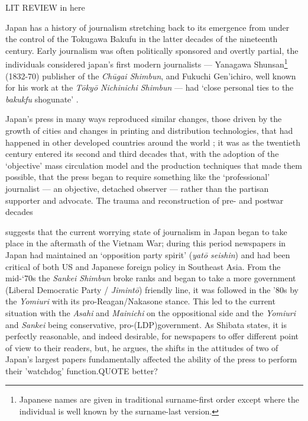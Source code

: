 \documentclass[11pt, headings=normal]{scrartcl}
\begin{document}
{LIT REVIEW in here}

Japan has a history of journalism stretching back to its emergence from
under the control of the Tokugawa Bakufu in the latter decades of the
nineteenth century. Early journalism was often politically sponsored and
overtly partial, the individuals considered japan's first modern
journalists --- Yanagawa Shunsan\footnote{Japanese names are given in
  traditional surname-first order except where the individual is well
  known by the surname-last version.} (1832-70) publisher of the
\emph{Chūgai Shimbun}, and Fukuchi Gen'ichiro, well known for his work
at the \emph{Tōkyō Nichinichi Shimbun}\autocite[32]{Huffman:1997} ---
had `close personal ties to the \emph{bakukfu} shogunate'
\autocite[p9]{Schafer:2012}.

Japan's press in many ways reproduced similar changes, those driven by
the growth of cities and changes in printing and distribution
technologies, that had happened in other developed countries around the
world \autocite[see, for example][3--4]{McChesney:2003a}; it was as the
twentieth century entered its second and third decades that, with the
adoption of the `objective' mass circulation model and the production
techniques that made them possible, that the press began to require
something like the `professional' journalist --- an objective, detached
observer --- rather than the partisan supporter and advocate. The trauma
and reconstruction of pre- and postwar decades

\textcite[12--3]{Shibata:2003} suggests that the current worrying state
of journalism in Japan began to take place in the aftermath of the
Vietnam War; during this period newspapers in Japan had maintained an
`opposition party spirit' (\emph{yatō seishin}) and had been critical of
both US and Japanese foreign policy in Southeast Asia. From the mid-`70s
the \emph{Sankei Shimbun} broke ranks and began to take a more
government (Liberal Democratic Party / \emph{Jimintō}) friendly line, it
was followed in the '80s by the \emph{Yomiuri} with its
pro-Reagan/Nakasone stance. This led to the current situation with the
\emph{Asahi} and \emph{Mainichi} on the oppositional side and the
\emph{Yomiuri} and \emph{Sankei} being conservative,
pro-(LDP)government. As Shibata states, it is perfectly reasonable, and
indeed desirable, for newspapers to offer different point of view to
their readers, but, he argues, the shifts in the attitudes of two of
Japan's largest papers fundamentally affected the ability of the press
to perform their 'watchdog' function.{QUOTE better?}
\end{document}
